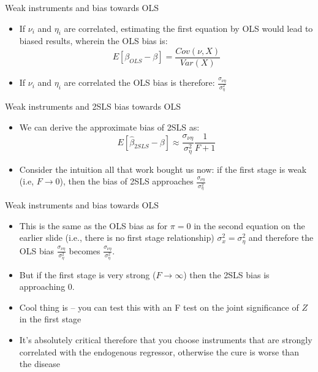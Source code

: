 \documentclass{beamer}
\begin{document}
\begin{frame}{Weak instruments and bias towards OLS}

\begin{itemize}
	\item If $\nu_i$ and $\eta_i$ are correlated, estimating the first equation by OLS would lead to biased results, wherein the OLS bias is:$$E[\beta_{OLS} - \beta] = \frac{ Cov(\nu, X)}{Var(X)}$$
	\item If $\nu_i$ and $\eta_i$ are correlated the OLS bias is therefore: $\frac{\sigma_{\nu \eta}}{\sigma^2_\eta}$
\end{itemize}

\end{frame}


\begin{frame}{Weak instruments and 2SLS bias towards OLS}
	
	\begin{itemize}
	\item We can derive the approximate bias of 2SLS as:$$E[\widehat{\beta}_{2SLS} - \beta] \approx \frac{\sigma_{\nu \eta}}{\sigma^2_\eta} \frac{1}{F+1}$$
	\item Consider the intuition all that work bought us now: if the first stage is weak (i.e, $F\rightarrow{0}$), then the bias of 2SLS approaches $\frac{\sigma_{\nu \eta}}{\sigma^2_\eta}$
	\end{itemize}
\end{frame}

\begin{frame}{Weak instruments and bias towards OLS}

\begin{itemize}
	\item This is the same as the OLS bias as for $\pi=0$ in the second equation on the earlier slide (i.e., there is no first stage relationship) $\sigma^2_x = \sigma^2_\eta$ and therefore the OLS bias $\frac{\sigma_{\nu \eta}}{\sigma^2_\eta}$ becomes $\frac{\sigma_{\nu \eta}}{\sigma^2_\eta}$.
	\item But if the first stage is very strong ($F\rightarrow{\infty}$) then the 2SLS bias is approaching 0.
	\item Cool thing is -- you can test this with an F test on the joint significance of $Z$ in the first stage
	\item It's absolutely critical therefore that you choose instruments that are strongly correlated with the endogenous regressor, otherwise the cure is worse than the disease
\end{itemize}

\end{frame}
\end{document}
